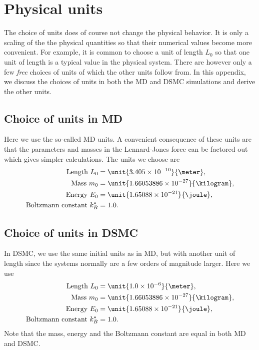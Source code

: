 \chapter{Physical units}
\label{app:physical_units}
The choice of units does of course not change the physical behavior. It is only a scaling of the the physical quantities so that their numerical values become more convenient. For example, it is common to choose a unit of length $L_0$ so that one unit of length is a typical value in the physical system. There are however only a few \textit{free} choices of units of which the other units follow from. In this appendix, we discuss the choices of units in both the MD and DSMC simulations and derive the other units.
\section{Choice of units in MD}
Here we use the so-called MD units. A convenient consequence of these units are that the parameters and masses in the Lennard-Jones force can be factored out which gives simpler calculations. The units we choose are
\begin{align}
	\text{Length } L_0 &= \unit{3.405\e{-10}}{\meter},\\
	\text{Mass } m_0 &= \unit{1.66053886\e{-27}}{\kilogram},\\
	\text{Energy } E_0 &= \unit{1.65088\e{-21}}{\joule},\\
	\text{Boltzmann constant } k_B^* &= 1.0.
\end{align}
\section{Choice of units in DSMC}
In DSMC, we use the same initial units as in MD, but with another unit of length since the systems normally are a few orders of magnitude larger. Here we use
\begin{align}
	\text{Length } L_0 &= \unit{1.0\e{-6}}{\meter},\\
	\text{Mass } m_0 &= \unit{1.66053886\e{-27}}{\kilogram},\\
	\text{Energy } E_0 &= \unit{1.65088\e{-21}}{\joule},\\
	\text{Boltzmann constant } k_B^* &= 1.0.
\end{align}
Note that the mass, energy and the Boltzmann constant are equal in both MD and DSMC. 
